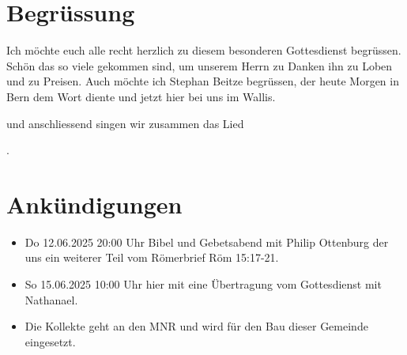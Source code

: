 \documentclass{../../inc/mybib}
\begin{document}
\section{Begrüssung}

Ich möchte euch alle recht herzlich zu diesem besonderen Gottesdienst begrüssen. Schön das so viele gekommen sind, um unserem Herrn zu Danken ihn zu Loben und zu Preisen.
Auch möchte ich Stephan Beitze begrüssen, der heute Morgen in Bern dem Wort diente und jetzt hier bei uns im Wallis. 

\noindent
\beten{} und anschliessend singen wir zusammen das Lied

\noindent
{}.

\section{Ankündigungen}
\begin{itemize}
    \item {} Do 12.06.2025 20:00 Uhr Bibel und Gebetsabend mit Philip Ottenburg  der uns ein weiterer Teil vom Römerbrief Röm 15:17-21.
    \item {} So 15.06.2025 10:00 Uhr hier mit eine Übertragung vom Gottesdienst mit Nathanael.    
    \item {} Die Kollekte geht an den MNR und wird für den Bau dieser Gemeinde eingesetzt.
\end{itemize}
\end{document}
